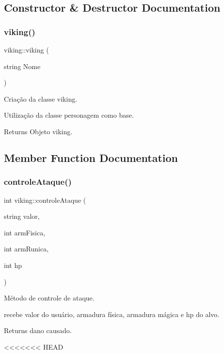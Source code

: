 \subsection{Constructor \& Destructor Documentation}
\mbox{\label{classviking_aec7e94a062284984afac0ffc49ea5213}} 
\subsubsection{\texorpdfstring{viking()}{viking()}}
{\footnotesize\ttfamily viking\+::viking (\begin{DoxyParamCaption}\item[{string}]{Nome }\end{DoxyParamCaption})}



Criação da classe viking. 

Utilização da classe personagem como base. \begin{DoxyReturn}{Returns}
Objeto viking. 
\end{DoxyReturn}


\subsection{Member Function Documentation}
\mbox{\label{classviking_aba7bbd831d9b38d98b74ca805d2ea250}} 
\subsubsection{\texorpdfstring{controle\+Ataque()}{controleAtaque()}}
{\footnotesize\ttfamily int viking\+::controle\+Ataque (\begin{DoxyParamCaption}\item[{string}]{valor,  }\item[{int}]{arm\+Fisica,  }\item[{int}]{arm\+Runica,  }\item[{int}]{hp }\end{DoxyParamCaption})}



Método de controle de ataque. 

recebe valor do usuário, armadura física, armadura mágica e hp do alvo. \begin{DoxyReturn}{Returns}
dano causado. 
\end{DoxyReturn}
<<<<<<< HEAD
\mbox{\label{classviking_a486735595f8a0f86a075699bec76c03e}} 
